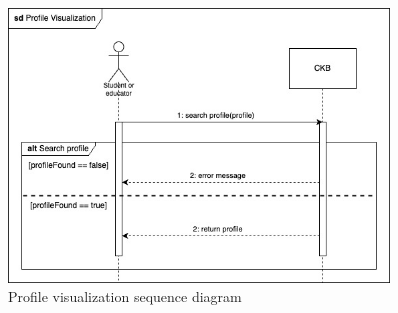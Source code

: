 \begin{figure}[H]
    \centering
    \includegraphics[width=0.9\textwidth]{images/seq_diagrams/ProfileVis.jpg}
    \caption{Profile visualization sequence diagram}
    \label{fig:sequence_diagram}
\end{figure}
\clearpage

